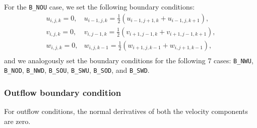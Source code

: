 \documentclass[a4paper, 12pt]{article}
\begin{document}
For the \texttt{B\_NOU} case, we set the following boundary conditions:
\begin{equation}
\begin{array}{ll}
u_{i,j,k} = 0, & u_{i-1,j,k} = \frac{1}{2}(u_{i-1,j+1,k}+u_{i-1,j,k+1}), \\
v_{i,j,k} = 0, & v_{i,j-1,k} = \frac{1}{2}(v_{i+1,j-1,k}+v_{i+1,j-1,k+1}), \\
w_{i,j,k} = 0, & w_{i,j,k-1} = \frac{1}{2}(w_{i+1,j,k-1}+w_{i,j+1,k-1}), \\
\end{array}
\end{equation}
and we analogously set the boundary conditions for the following 7 cases: \texttt{B\_NWU}, \texttt{B\_NOD}, \texttt{B\_NWD}, \texttt{B\_SOU}, \texttt{B\_SWU}, \texttt{B\_SOD}, and \texttt{B\_SWD}.

\subsubsection{Outflow boundary condition}\label{sec:outflow}
For outflow conditions, the normal derivatives of both the velocity components are zero. 
%
%
\end{document}

